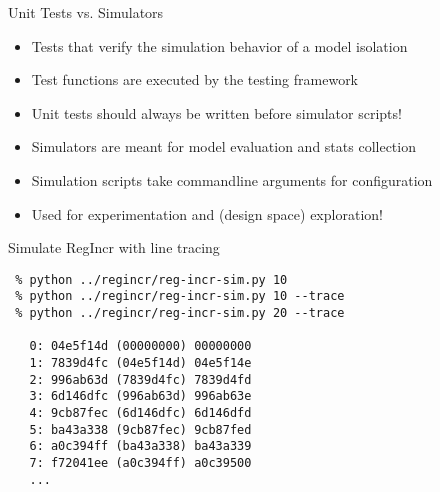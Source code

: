 \begin{frame}{Unit Tests vs. Simulators}

 
\begin{itemize}
  \item Tests that verify the simulation behavior of a model isolation
  \item Test functions are executed by the  testing framework
  \item Unit tests should always be written before simulator scripts!
\end{itemize}

\vspace{0.2in}

 
\begin{itemize}
  \item Simulators are meant for model evaluation and stats collection
  \item Simulation scripts take commandline arguments for configuration
  \item Used for experimentation and (design space) exploration!
\end{itemize}

\end{frame}

\begin{task}\begin{frame}[fragile]{Simulate RegIncr with line tracing}

\vspace{-0.15in}
\begin{Verbatim}[commandchars=\\\{\}]
 % cd \midtilde/pymtl-tut/build
 % python ../regincr/reg-incr-sim.py 10
 % python ../regincr/reg-incr-sim.py 10 --trace
 % python ../regincr/reg-incr-sim.py 20 --trace

   0: 04e5f14d (00000000) 00000000
   1: 7839d4fc (04e5f14d) 04e5f14e
   2: 996ab63d (7839d4fc) 7839d4fd
   3: 6d146dfc (996ab63d) 996ab63e
   4: 9cb87fec (6d146dfc) 6d146dfd
   5: ba43a338 (9cb87fec) 9cb87fed
   6: a0c394ff (ba43a338) ba43a339
   7: f72041ee (a0c394ff) a0c39500
   ...
\end{Verbatim}

\end{frame}
\end{task}

